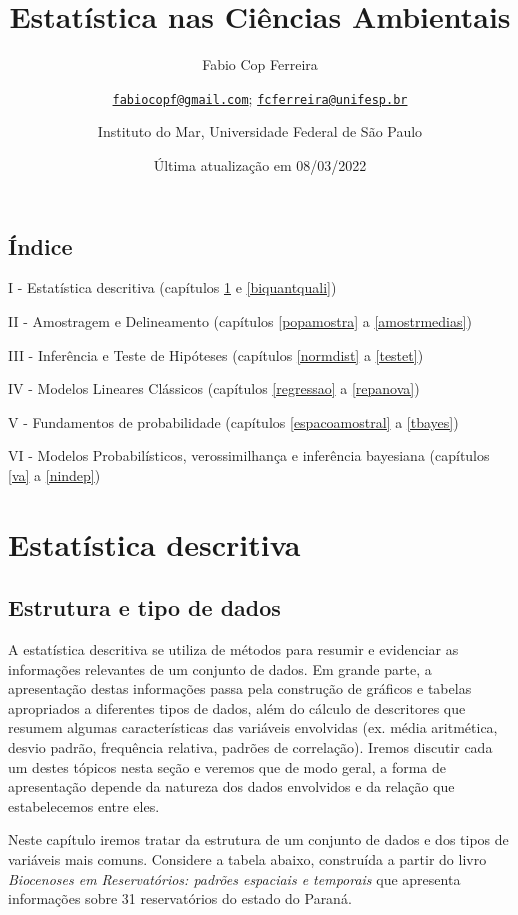 \documentclass[
]{book}
\title{Estatística nas Ciências Ambientais}
\author{Fabio Cop Ferreira \and \href{mailto:fabiocopf@gmail.com}{\nolinkurl{fabiocopf@gmail.com}}; \href{mailto:fcferreira@unifesp.br}{\nolinkurl{fcferreira@unifesp.br}} \and Instituto do Mar, Universidade Federal de São Paulo}
\date{Última atualização em 08/03/2022}
\begin{document}
\maketitle

{
\setcounter{tocdepth}{1}
\tableofcontents
}
\hypertarget{uxedndice}{%
\chapter*{Índice}\label{uxedndice}}

I - Estatística descritiva (capítulos \ref{estrdados} e \ref{biquantquali})

II - Amostragem e Delineamento (capítulos \ref{popamostra} a \ref{amostrmedias})

III - Inferência e Teste de Hipóteses (capítulos \ref{normdist} a \ref{testet})

IV - Modelos Lineares Clássicos (capítulos \ref{regressao} a \ref{repanova})

V - Fundamentos de probabilidade (capítulos \ref{espacoamostral} a \ref{tbayes})

VI - Modelos Probabilísticos, verossimilhança e inferência bayesiana (capítulos \ref{va} a \ref{nindep})

\hypertarget{part-estatuxedstica-descritiva}{%
\part{Estatística descritiva}\label{part-estatuxedstica-descritiva}}

\hypertarget{estrdados}{%
\chapter{Estrutura e tipo de dados}\label{estrdados}}

A estatística descritiva se utiliza de métodos para resumir e evidenciar as informações relevantes de um conjunto de dados. Em grande parte, a apresentação destas informações passa pela construção de gráficos e tabelas apropriados a diferentes tipos de dados, além do cálculo de descritores que resumem algumas características das variáveis envolvidas (ex. média aritmética, desvio padrão, frequência relativa, padrões de correlação). Iremos discutir cada um destes tópicos nesta seção e veremos que de modo geral, a forma de apresentação depende da natureza dos dados envolvidos e da relação que estabelecemos entre eles.

Neste capítulo iremos tratar da estrutura de um conjunto de dados e dos tipos de variáveis mais comuns. Considere a tabela abaixo, construída a partir do livro \emph{Biocenoses em Reservatórios: padrões espaciais e temporais} \citep{rodriguesetal2005} que apresenta informações sobre 31 reservatórios do estado do Paraná.
\end{document}
